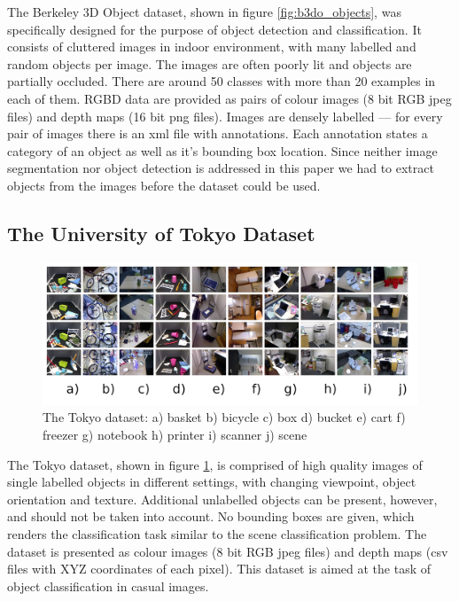 \documentclass[12pt]{article}
\begin{document}
    The Berkeley 3D Object dataset, shown in figure \ref{fig:b3do_objects}, was 
specifically designed for the purpose of object detection and classification. 
It consists of cluttered images in indoor environment, with many labelled and 
random objects per image. The images are often poorly lit and objects are 
partially occluded. There are around 50 classes with more than 20 examples in 
each of them. RGBD data are provided as pairs of colour images (8 bit RGB jpeg 
files) and depth maps (16 bit png files). Images are densely labelled --- for 
every pair of images there is an xml file with annotations. Each annotation 
states a category of an object as well as it's bounding box location. Since 
neither image segmentation nor object detection is addressed in this paper we 
had to extract objects from the images before the dataset could be used.

  \subsection{The University of Tokyo Dataset}	
    \begin{figure}[!ht]
    \centering
    \includegraphics[width=1\textwidth]{../figs/tokyo_horizontal}
    \caption{The Tokyo dataset: a) basket b) bicycle c) box d) bucket e) cart 
f) freezer g) notebook h) printer i) scanner j) scene}
    \label{fig:tokyo}
    \end{figure}

    The Tokyo dataset, shown in figure \ref{fig:tokyo}, is comprised of high 
quality images of single labelled objects in different settings, with changing 
viewpoint, object orientation and texture. Additional unlabelled objects can be 
present, however, and should not be taken into account. No bounding boxes are 
given, which renders the classification task similar to the scene 
classification problem. The dataset is presented as colour images (8 bit RGB 
jpeg files) and depth maps (csv files with XYZ coordinates of each pixel). This 
dataset is aimed at the task of object classification in casual images.
\end{document}
